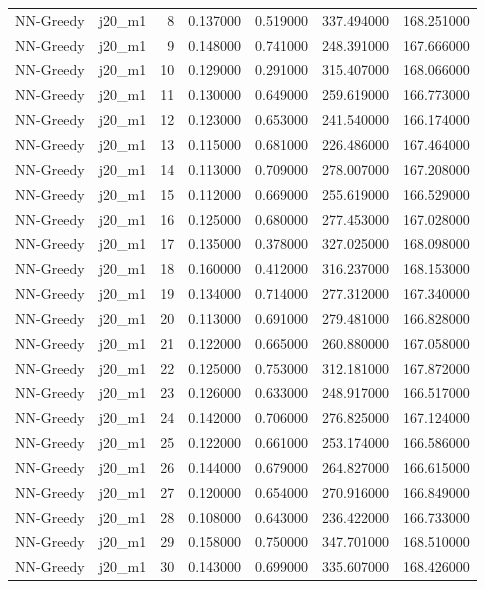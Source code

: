 \begin{tabular}{llrrrrr}
NN-Greedy & j20_m1 & 8 & 0.137000 & 0.519000 & 337.494000 & 168.251000 \\
NN-Greedy & j20_m1 & 9 & 0.148000 & 0.741000 & 248.391000 & 167.666000 \\
NN-Greedy & j20_m1 & 10 & 0.129000 & 0.291000 & 315.407000 & 168.066000 \\
NN-Greedy & j20_m1 & 11 & 0.130000 & 0.649000 & 259.619000 & 166.773000 \\
NN-Greedy & j20_m1 & 12 & 0.123000 & 0.653000 & 241.540000 & 166.174000 \\
NN-Greedy & j20_m1 & 13 & 0.115000 & 0.681000 & 226.486000 & 167.464000 \\
NN-Greedy & j20_m1 & 14 & 0.113000 & 0.709000 & 278.007000 & 167.208000 \\
NN-Greedy & j20_m1 & 15 & 0.112000 & 0.669000 & 255.619000 & 166.529000 \\
NN-Greedy & j20_m1 & 16 & 0.125000 & 0.680000 & 277.453000 & 167.028000 \\
NN-Greedy & j20_m1 & 17 & 0.135000 & 0.378000 & 327.025000 & 168.098000 \\
NN-Greedy & j20_m1 & 18 & 0.160000 & 0.412000 & 316.237000 & 168.153000 \\
NN-Greedy & j20_m1 & 19 & 0.134000 & 0.714000 & 277.312000 & 167.340000 \\
NN-Greedy & j20_m1 & 20 & 0.113000 & 0.691000 & 279.481000 & 166.828000 \\
NN-Greedy & j20_m1 & 21 & 0.122000 & 0.665000 & 260.880000 & 167.058000 \\
NN-Greedy & j20_m1 & 22 & 0.125000 & 0.753000 & 312.181000 & 167.872000 \\
NN-Greedy & j20_m1 & 23 & 0.126000 & 0.633000 & 248.917000 & 166.517000 \\
NN-Greedy & j20_m1 & 24 & 0.142000 & 0.706000 & 276.825000 & 167.124000 \\
NN-Greedy & j20_m1 & 25 & 0.122000 & 0.661000 & 253.174000 & 166.586000 \\
NN-Greedy & j20_m1 & 26 & 0.144000 & 0.679000 & 264.827000 & 166.615000 \\
NN-Greedy & j20_m1 & 27 & 0.120000 & 0.654000 & 270.916000 & 166.849000 \\
NN-Greedy & j20_m1 & 28 & 0.108000 & 0.643000 & 236.422000 & 166.733000 \\
NN-Greedy & j20_m1 & 29 & 0.158000 & 0.750000 & 347.701000 & 168.510000 \\
NN-Greedy & j20_m1 & 30 & 0.143000 & 0.699000 & 335.607000 & 168.426000 \\

\end{tabular}
